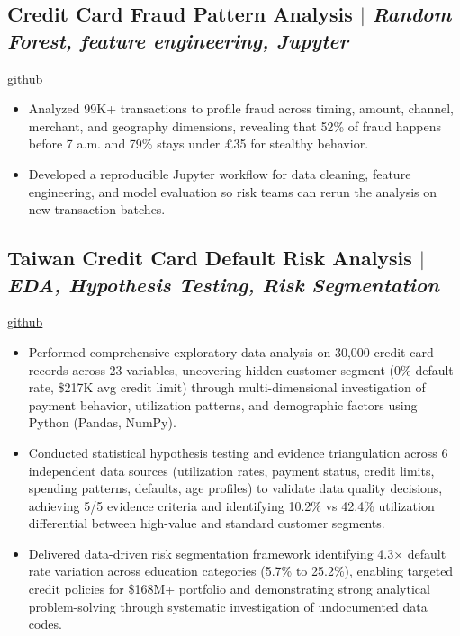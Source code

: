 \documentclass[11pt,letterpaper]{article}
\begin{document}
\subsection*{Credit Card Fraud Pattern Analysis $\vert$ \normalfont\textit{Random Forest, feature engineering, Jupyter}} \hfill \href{https://github.com/blue-jays/Credit-Card-Fraud-Pattern-Analysis}{github}
\begin{itemize}[leftmargin=*,noitemsep,topsep=2pt]
    \item Analyzed 99K+ transactions to profile fraud across timing, amount, channel, merchant, and geography dimensions, revealing that 52\% of fraud happens before 7 a.m. and 79\% stays under £35 for stealthy behavior.
    \item Developed a reproducible Jupyter workflow for data cleaning, feature engineering, and model evaluation so risk teams can rerun the analysis on new transaction batches.
\end{itemize}

\subsection*{Taiwan Credit Card Default Risk Analysis $\vert$ \normalfont\textit{EDA, Hypothesis Testing, Risk Segmentation}} \hfill \href{https://github.com/blue-jays/Taiwan_Credit_Card_Default}{github}
\begin{itemize}[leftmargin=*,noitemsep,topsep=2pt]
    \item Performed comprehensive exploratory data analysis on 30,000 credit card records across 23 variables, uncovering hidden customer segment (0\% default rate, \$217K avg credit limit) through multi-dimensional investigation of payment behavior, utilization patterns, and demographic factors using Python (Pandas, NumPy).
    \item Conducted statistical hypothesis testing and evidence triangulation across 6 independent data sources (utilization rates, payment status, credit limits, spending patterns, defaults, age profiles) to validate data quality decisions, achieving 5/5 evidence criteria and identifying 10.2\% vs 42.4\% utilization differential between high-value and standard customer segments.
    \item Delivered data-driven risk segmentation framework identifying 4.3× default rate variation across education categories (5.7\% to 25.2\%), enabling targeted credit policies for \$168M+ portfolio and demonstrating strong analytical problem-solving through systematic investigation of undocumented data codes.
\end{itemize}
\end{document}

